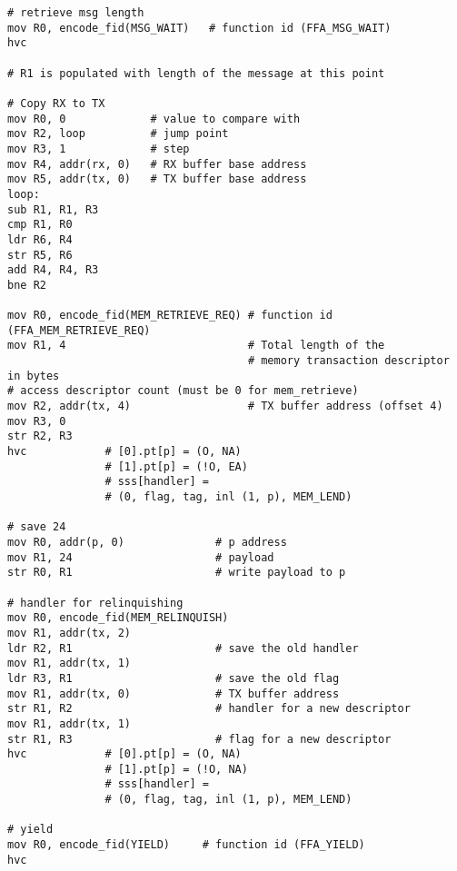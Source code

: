 \documentclass{article}
\begin{document}
\begin{lstlisting}[caption={VM 1}]
# retrieve msg length
mov R0, encode_fid(MSG_WAIT)   # function id (FFA_MSG_WAIT)
hvc

# R1 is populated with length of the message at this point

# Copy RX to TX
mov R0, 0             # value to compare with
mov R2, loop          # jump point
mov R3, 1             # step
mov R4, addr(rx, 0)   # RX buffer base address
mov R5, addr(tx, 0)   # TX buffer base address
loop:
sub R1, R1, R3
cmp R1, R0
ldr R6, R4
str R5, R6
add R4, R4, R3
bne R2

mov R0, encode_fid(MEM_RETRIEVE_REQ) # function id (FFA_MEM_RETRIEVE_REQ)
mov R1, 4                            # Total length of the
                                     # memory transaction descriptor in bytes
# access descriptor count (must be 0 for mem_retrieve)
mov R2, addr(tx, 4)                  # TX buffer address (offset 4)
mov R3, 0
str R2, R3
hvc            # [0].pt[p] = (O, NA)
               # [1].pt[p] = (!O, EA)
               # sss[handler] =
               # (0, flag, tag, inl (1, p), MEM_LEND)

# save 24
mov R0, addr(p, 0)              # p address
mov R1, 24                      # payload
str R0, R1                      # write payload to p

# handler for relinquishing
mov R0, encode_fid(MEM_RELINQUISH)
mov R1, addr(tx, 2)
ldr R2, R1                      # save the old handler
mov R1, addr(tx, 1)
ldr R3, R1                      # save the old flag
mov R1, addr(tx, 0)             # TX buffer address
str R1, R2                      # handler for a new descriptor
mov R1, addr(tx, 1)
str R1, R3                      # flag for a new descriptor
hvc            # [0].pt[p] = (O, NA)
               # [1].pt[p] = (!O, NA)
               # sss[handler] =
               # (0, flag, tag, inl (1, p), MEM_LEND)

# yield
mov R0, encode_fid(YIELD)     # function id (FFA_YIELD)
hvc
\end{lstlisting}
\end{document}
